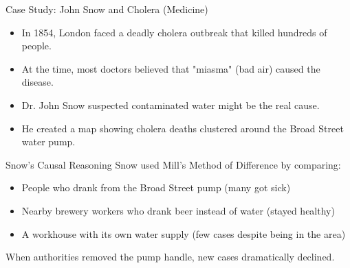 \documentclass{beamer}
\begin{document}
\begin{frame}{Case Study: John Snow and Cholera (Medicine)}
    \begin{itemize}
        \item In 1854, London faced a deadly cholera outbreak that killed hundreds of people.
        \item At the time, most doctors believed that "miasma" (bad air) caused the disease.
        \item Dr. John Snow suspected contaminated water might be the real cause.
        \item He created a map showing cholera deaths clustered around the Broad Street water pump.
    \end{itemize}
    
    \begin{block}{Snow's Causal Reasoning}
        Snow used Mill's Method of Difference by comparing:
        \begin{itemize}
            \item People who drank from the Broad Street pump (many got sick)
            \item Nearby brewery workers who drank beer instead of water (stayed healthy)
            \item A workhouse with its own water supply (few cases despite being in the area)
        \end{itemize}
        When authorities removed the pump handle, new cases dramatically declined.
    \end{block}
\end{frame}
\end{document}
